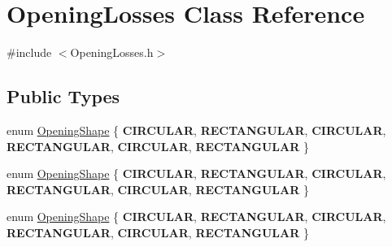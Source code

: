 \hypertarget{class_opening_losses}{}\section{Opening\+Losses Class Reference}
\label{class_opening_losses}


{\ttfamily \#include $<$Opening\+Losses.\+h$>$}

\subsection*{Public Types}
\begin{DoxyCompactItemize}
\item 
enum \hyperlink{class_opening_losses_a57f9759b6fd72a1b75aa885800e26157}{Opening\+Shape} \{ \newline
{\bfseries C\+I\+R\+C\+U\+L\+AR}, 
{\bfseries R\+E\+C\+T\+A\+N\+G\+U\+L\+AR}, 
{\bfseries C\+I\+R\+C\+U\+L\+AR}, 
{\bfseries R\+E\+C\+T\+A\+N\+G\+U\+L\+AR}, 
\newline
{\bfseries C\+I\+R\+C\+U\+L\+AR}, 
{\bfseries R\+E\+C\+T\+A\+N\+G\+U\+L\+AR}
 \}
\item 
enum \hyperlink{class_opening_losses_a57f9759b6fd72a1b75aa885800e26157}{Opening\+Shape} \{ \newline
{\bfseries C\+I\+R\+C\+U\+L\+AR}, 
{\bfseries R\+E\+C\+T\+A\+N\+G\+U\+L\+AR}, 
{\bfseries C\+I\+R\+C\+U\+L\+AR}, 
{\bfseries R\+E\+C\+T\+A\+N\+G\+U\+L\+AR}, 
\newline
{\bfseries C\+I\+R\+C\+U\+L\+AR}, 
{\bfseries R\+E\+C\+T\+A\+N\+G\+U\+L\+AR}
 \}
\item 
enum \hyperlink{class_opening_losses_a57f9759b6fd72a1b75aa885800e26157}{Opening\+Shape} \{ \newline
{\bfseries C\+I\+R\+C\+U\+L\+AR}, 
{\bfseries R\+E\+C\+T\+A\+N\+G\+U\+L\+AR}, 
{\bfseries C\+I\+R\+C\+U\+L\+AR}, 
{\bfseries R\+E\+C\+T\+A\+N\+G\+U\+L\+AR}, 
\newline
{\bfseries C\+I\+R\+C\+U\+L\+AR}, 
{\bfseries R\+E\+C\+T\+A\+N\+G\+U\+L\+AR}
 \}
\end{DoxyCompactItemize}
